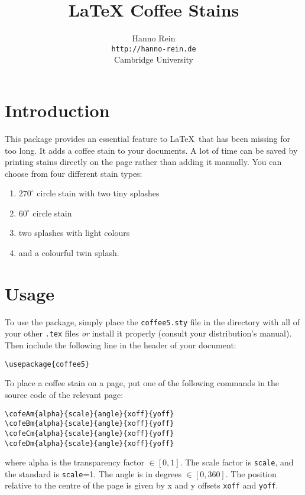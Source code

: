 \documentclass{article}
\begin{document}
\title{LaTeX Coffee Stains}
\author{Hanno Rein\\
\texttt{http://hanno-rein.de}\\
Cambridge University}
\maketitle


\section{Introduction}
This package provides an essential feature to \LaTeX~that has been missing for too long. It adds a coffee stain to your documents. A lot of time can be saved by printing stains directly on the page rather than adding it manually. You can choose from four different stain types:
\begin{enumerate}
  \item $270^\circ$ circle stain with two tiny splashes 
  \item $60^\circ$ circle stain 
  \item two splashes with light colours
  \item and a colourful twin splash.
\end{enumerate}

\section{Usage}
To use the package, simply place the \texttt{coffee5.sty} file in the directory with all of your 
other \texttt{.tex} files \textit{or} install it properly (consult your distribution's manual). 
Then include the following line in the header of your document:
\begin{verbatim}
\usepackage{coffee5}
\end{verbatim}
To place a coffee stain on a page, put one of the following commands in the source code of the relevant page: 
\begin{verbatim}
\cofeAm{alpha}{scale}{angle}{xoff}{yoff}
\cofeBm{alpha}{scale}{angle}{xoff}{yoff}
\cofeCm{alpha}{scale}{angle}{xoff}{yoff}
\cofeDm{alpha}{scale}{angle}{xoff}{yoff}
\end{verbatim}
where alpha is the transparency factor $\in [0,1]$. The scale factor is {\tt scale}, and the standard is {\tt scale}=1. 
The angle is in degrees $\in [0,360]$. 
The position relative to the centre of the page is given by x and y
offsets \texttt{xoff} and \texttt{yoff}.
\end{document}
